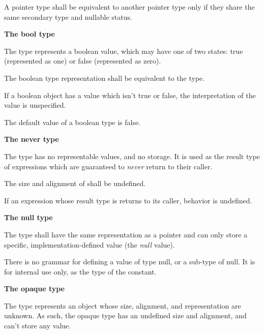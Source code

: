 \specsubsubitem
A pointer type shall be equivalent to another pointer type only if they share
the same secondary type and nullable status.


\textbf{The bool type}

\specsubsubitem
The  type represents a boolean value, which may have one of two
states: true (represented as one) or false (represented as zero).

\specsubsubitem
The boolean type representation shall be equivalent to the  type.

\specsubsubitem
If a boolean object has a value which isn't true or false, the interpretation of
the value is unspecified.

\specsubsubitem
The default value of a boolean type is false.

\textbf{The never type}

\specsubsubitem
The  type has no representable values, and no storage. It is
used as the result type of expressions which are guaranteed to \textit{never}
return to their caller.

\specsubsubitem
The size and alignment of  shall be undefined.

\specsubsubitem
If an expression whose result type is  returns to its caller,
behavior is undefined.


\textbf{The null type}

\specsubsubitem
The  type shall have the same representation as a pointer and can
only store a specific, implementation-defined value (the \textit{null} value).

\specsubsubitem
There is no grammar for defining a value of type null, or a sub-type of null. It
is for internal use only, as the type of the  constant.

\textbf{The opaque type}

The  type represents an object whose size, alignment, and
representation are unknown. As such, the opaque type has an undefined size and
alignment, and can't store any value.


